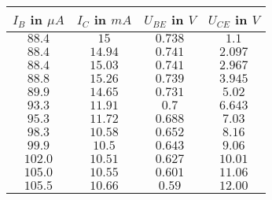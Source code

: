 \begin{tabular}{c|c|c|c}
\(I_B\) in \(\mu A\) & \(I_C\) in \(mA\) & \(U_{BE}\) in \(V\) & \(U_{CE}\) in \(V\) \\ \hline
\( 88.4\) & \(15\) & \(0.738\) & \(1.1\) \\ 
\(88.4\) & \(14.94\) & \(0.741\) & \(2.097\) \\ 
\(88.4\) & \(15.03\) & \(0.741\) & \(2.967\) \\ 
\(88.8\) & \(15.26\) & \(0.739\) & \(3.945\) \\ 
\(89.9\) & \(14.65\) & \(0.731\) & \(5.02\) \\ 
\(93.3\) & \(11.91\) & \(0.7\) & \(6.643\) \\ 
\(95.3\) & \(11.72\) & \(0.688\) & \(7.03\) \\ 
\(98.3\) & \(10.58\) & \(0.652\) & \(8.16\) \\ 
\(99.9\) & \(10.5\) & \(0.643\) & \(9.06\) \\ 
\(102.0\) & \(10.51\) & \(0.627\) & \(10.01\) \\ 
\(105.0\) & \(10.55\) & \(0.601\) & \(11.06\) \\ 
\(105.5\) & \(10.66\) & \(0.59\) & \(12.00 \)
\end{tabular}